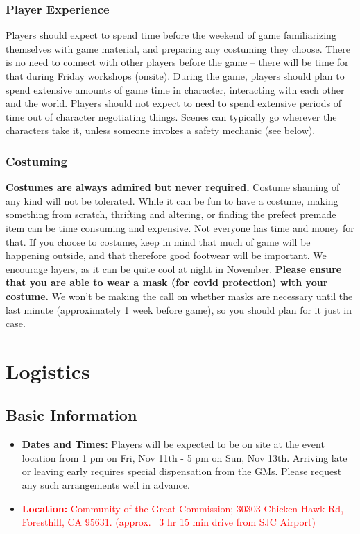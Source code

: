 \documentclass[sheet]{GL2020}
\begin{document}
\subsubsection{Player Experience}
Players should expect to spend time before the weekend of game familiarizing themselves with game material, and preparing any costuming they choose. There is no need to connect with other players before the game -- there will be time for that during Friday workshops (onsite). During the game, players should plan to spend extensive amounts of game time in character, interacting with each other and the world. Players should not expect to need to spend extensive periods of time out of character negotiating things. Scenes can typically go wherever the characters take it, unless someone invokes a safety mechanic (see below).

\subsubsection{Costuming} 
\textbf{Costumes are always admired but never required.} Costume shaming of any kind will not be tolerated. While it can be fun to have a costume, making something from scratch, thrifting and altering, or finding the prefect premade item can be time consuming and expensive. Not everyone has time and money for that. If you choose to costume, keep in mind that much of game will be happening outside, and that therefore good footwear will be important. We encourage layers, as it can be quite cool at night in November. \textbf{Please ensure that you are able to wear a mask (for covid protection) with your costume.} We won't be making the call on whether masks are necessary until the last minute (approximately 1 week before game), so you should plan for it just in case.


\section{Logistics}
\subsection{Basic Information}
\begin{itemize}
  \item \textbf{Dates and Times:} Players will be expected to be on site at the event location from 1 pm  on Fri, Nov 11th - 5 pm on Sun, Nov 13th. Arriving late or leaving early requires special dispensation from the GMs. Please request any such arrangements well in advance.
  \item \textcolor{red}{\textbf{Location:} Community of the Great Commission; 30303 Chicken Hawk Rd, Foresthill, CA 95631. (approx. ~3 hr 15 min drive from SJC Airport)}
\end{itemize}
\end{document}
